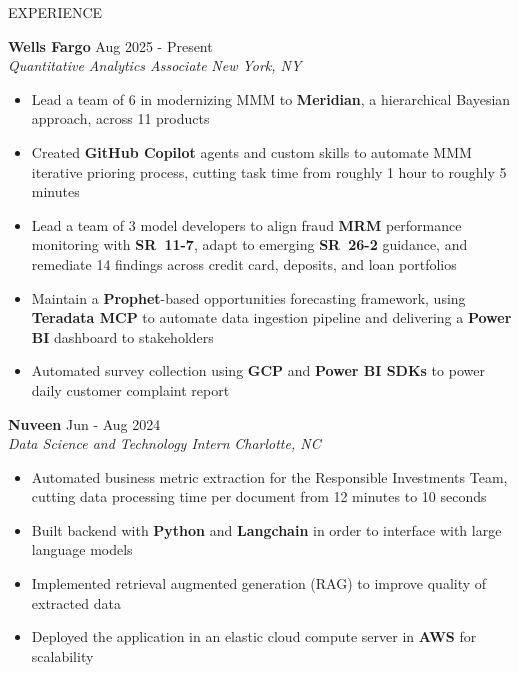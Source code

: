 \documentclass{resume} %
\begin{document}
\begin{rSection}{EXPERIENCE}

\textbf{Wells Fargo} \hfill Aug 2025 - Present\\
\textit{Quantitative Analytics Associate} \hfill \textit{New York, NY}
\vspace{-8pt}
 \begin{itemize}[leftmargin=*]
    \itemsep -7pt {}
    \item Lead a team of 6 in modernizing MMM to \textbf{Meridian}, a hierarchical Bayesian approach, across 11 products
    \item Created \textbf{GitHub Copilot} agents and custom skills to automate MMM iterative prioring process, cutting task time from roughly 1 hour to roughly 5 minutes
    \item Lead a team of 3 model developers to align fraud \textbf{MRM} performance monitoring with \textbf{SR~11-7}, adapt to emerging \textbf{SR~26-2} guidance, and remediate 14 findings across credit card, deposits, and loan portfolios
    \item Maintain a \textbf{Prophet}-based opportunities forecasting framework, using \textbf{Teradata MCP} to automate data ingestion pipeline and delivering a \textbf{Power BI} dashboard to stakeholders
    \item Automated survey collection using \textbf{GCP} and \textbf{Power BI SDKs} to power daily customer complaint report
 \end{itemize}
\vspace{-4pt}

\textbf{Nuveen} \hfill Jun - Aug 2024\\
\textit{Data Science and Technology Intern} \hfill \textit{Charlotte, NC}
\vspace{-8pt}
 \begin{itemize}[leftmargin=*]
    \itemsep -7pt {}
    \item Automated business metric extraction for the Responsible Investments Team, cutting data processing time per document from 12 minutes to 10 seconds
    \item Built backend with \textbf{Python} and \textbf{Langchain} in order to interface with large language models
    \item Implemented retrieval augmented generation (RAG) to improve quality of extracted data
    \item Deployed the application in an elastic cloud compute server in \textbf{AWS} for scalability
 \end{itemize}
\vspace{-4pt}


\end{rSection}
\end{document}
